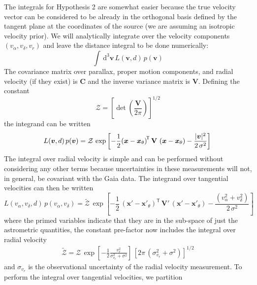 \documentclass[manuscript, letterpaper]{aastex6}
\newcommand{\dd}{\mathrm{d}}
\newcommand{\transp}[1]{{#1}^{\!\mathsf{T}}}
\newcommand{\bs}[1]{\boldsymbol{#1}}
\newcommand{\matrx}[1]{\mathbf{#1}}
\begin{document}
The integrals for Hypothesis 2 are somewhat easier because the true velocity
vector can be considered to be already in the orthogonal basis defined by the
tangent plane at the coordinates of the source (we are assuming an isotropic
velocity prior). We will analytically integrate over the velocity components
$(v_\alpha,v_\delta,v_r)$ and leave the distance integral to be done
numerically:
\begin{equation}
  \int \, \dd^3\bs{v} \, L(\bs{v}, d) \, p(\bs{v})
\end{equation}
The covariance matrix over parallax, proper motion components, and
radial velocity (if they exist) is $\matrx{C}$ and the inverse variance matrix
is $\matrx{V}$. Defining the constant
\begin{equation}
  \mathcal{Z} = \left[ \det \left(\frac{\matrx{V}}{2\pi} \right) \right]^{1/2}
\end{equation}
the integrand can be written
\begin{equation}
  L(\bs{v}, d) \, p(\bs{v}) = \mathcal{Z} \,
    \exp \left[ -\frac{1}{2} \transp{\left(\bs{x} - \bs{x}_\theta \right)} \,
    \matrx{V} \,
    \left(\bs{x} - \bs{x}_\theta \right)
    - \frac{|\bs{v}|^2}{2\,\sigma^2} \right] \\
\end{equation}
The integral over radial velocity is simple and can be performed without
considering any other terms because uncertainties in these measurements will
not, in general, be covariant with the Gaia data. The integrand over tangential
velocities can then be written
\begin{equation}
  L(v_\alpha, v_\delta, d) \, p(v_\alpha, v_\delta) = \tilde{\mathcal{Z}} \,
    \exp \left[ -\frac{1}{2}\,\transp{\left(\bs{x}' - \bs{x}'_\theta \right)} \,
    \matrx{V}' \,
    \left(\bs{x}' - \bs{x}'_\theta \right)
    - \frac{(v_\alpha^2 + v_\delta^2)}{2\,\sigma^2} \right]
    \label{eq:vtan-integrand}
\end{equation}
where the primed variables indicate that they are in the sub-space of just the
astrometric quantities, the constant pre-factor now includes the integral over
radial velocity
\begin{align}
  \tilde{\mathcal{Z}} = \mathcal{Z} \,
    \exp\left[-\frac{1}{2}\frac{v_r^2}{\sigma_{v_r}^2 + \sigma^2}\right] \,
    \left[ 2\pi \, (\sigma_{v_r}^2 + \sigma^2) \right]^{1/2}
\end{align}
and $\sigma_{v_r}$ is the observational uncertainty of the radial velocity
measurement. To perform the integral over tangential velocities, we partition
\end{document}
